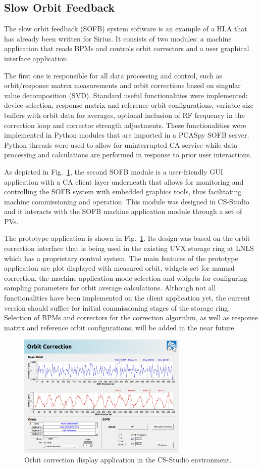 \subsection{Slow Orbit Feedback}

The slow orbit feedback (SOFB) system software is an example of a HLA that has already been written for Sirius. It consists of two modules: a machine application that reads BPMs and controls orbit correctors and a user graphical interface application.

The first one is responsible for all data processing and control, such as orbit/response matrix measurements and orbit corrections based on singular value decomposition (SVD). Standard useful functionalities were implemented: device selection, response matrix and reference orbit configurations, variable-size buffers with orbit data for averages, optional inclusion of RF frequency in the correction loop and corrector strength adjustments. These functionalities were implemented in Python modules that are imported in a PCASpy SOFB server. Python threads were used to allow for uninterrupted CA service while data processing and calculations are performed in response to prior user interactions.

As depicted in Fig.~\ref{fig:sofbf1}, the second SOFB module is a user-friendly GUI application with a CA client layer underneath that allows for monitoring and controlling the SOFB system with embedded graphics tools, thus facilitating machine commissioning and operation. This module was designed in CS-Studio and it interacts with the SOFB machine application module through a set of PVs.

The prototype application is shown in Fig.~\ref{fig:sofbf1}. Its design was based on the orbit correction interface that is being used in the existing UVX storage ring at LNLS which has a proprietary control system. The main features of the prototype application are plot displayed with measured orbit, widgets set for manual correction, the machine application mode selection and widgets for configuring sampling parameters for orbit average calculations. Although not all functionalities have been implemented on the client application yet, the current version should suffice for initial commissioning stages of the storage ring. Selection of BPMs and correctors for the correction algorithm, as well as response matrix and reference orbit configurations, will be added in the near future.

\begin{figure}[!htb]
   \centering
   \includegraphics*[width=230pt]{WEPOPRPO22f3}
   \caption{Orbit correction display application in the CS-Studio environment.}
   \label{fig:sofbf1}
\end{figure}